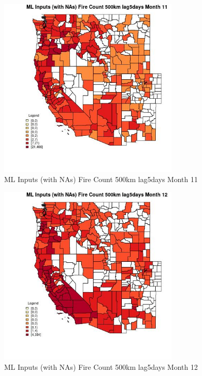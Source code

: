 \begin{figure} 
\centering  
\includegraphics[width=0.77\textwidth]{Code_Outputs/Report_ML_input_PM25_Step4_part_e_de_duplicated_aves_compiled_2019-05-21wNAs_CountyFire_Count_500km_lag5daysmedianMonth11.jpg} 
\caption{\label{fig:Report_ML_input_PM25_Step4_part_e_de_duplicated_aves_compiled_2019-05-21wNAsCountyFire_Count_500km_lag5daysmedianMonth11}ML Inputs (with NAs) Fire Count 500km lag5days Month 11} 
\end{figure} 
 

\begin{figure} 
\centering  
\includegraphics[width=0.77\textwidth]{Code_Outputs/Report_ML_input_PM25_Step4_part_e_de_duplicated_aves_compiled_2019-05-21wNAs_CountyFire_Count_500km_lag5daysmedianMonth12.jpg} 
\caption{\label{fig:Report_ML_input_PM25_Step4_part_e_de_duplicated_aves_compiled_2019-05-21wNAsCountyFire_Count_500km_lag5daysmedianMonth12}ML Inputs (with NAs) Fire Count 500km lag5days Month 12} 
\end{figure} 
 

